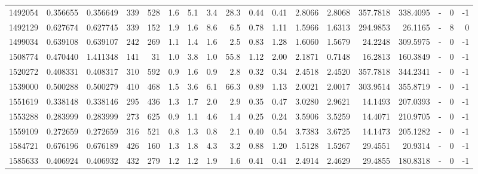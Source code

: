 \begin{tabular}{rrrrrrrrrrrrrrrlrr}
   1492054 & 0.356655 &   0.356649 &  339 &  528 &      1.6 &      5.1 &     3.4 &     28.3 &       0.44 &        0.41 &  2.8066 &  2.8068 &  357.7818 &  338.4095 &             - &        0 &         -1 \\
   1492129 & 0.627674 &   0.627745 &  339 &  152 &      1.9 &      1.6 &     8.6 &      6.5 &       0.78 &        1.11 &  1.5966 &  1.6313 &  294.9853 &   26.1165 &             - &        8 &          0 \\
   1499034 & 0.639108 &   0.639107 &  242 &  269 &      1.1 &      1.4 &     1.6 &      2.5 &       0.83 &        1.28 &  1.6060 &  1.5679 &   24.2248 &  309.5975 &             - &        0 &         -1 \\
   1508774 & 0.470440 &   1.411348 &  141 &   31 &      1.0 &      3.8 &     1.0 &     55.8 &       1.12 &        2.00 &  2.1871 &  0.7148 &   16.2813 &  160.3849 &             - &        0 &         -1 \\
   1520272 & 0.408331 &   0.408317 &  310 &  592 &      0.9 &      1.6 &     0.9 &      2.8 &       0.32 &        0.34 &  2.4518 &  2.4520 &  357.7818 &  344.2341 &             - &        0 &         -1 \\
   1539000 & 0.500288 &   0.500279 &  410 &  468 &      1.5 &      3.6 &     6.1 &     66.3 &       0.89 &        1.13 &  2.0021 &  2.0017 &  303.9514 &  355.8719 &             - &        0 &         -1 \\
   1551619 & 0.338148 &   0.338146 &  295 &  436 &      1.3 &      1.7 &     2.0 &      2.9 &       0.35 &        0.47 &  3.0280 &  2.9621 &   14.1493 &  207.0393 &             - &        0 &         -1 \\
   1553288 & 0.283999 &   0.283999 &  273 &  625 &      0.9 &      1.1 &     4.6 &      1.4 &       0.25 &        0.24 &  3.5906 &  3.5259 &   14.4071 &  210.9705 &             - &        0 &         -1 \\
   1559109 & 0.272659 &   0.272659 &  316 &  521 &      0.8 &      1.3 &     0.8 &      2.1 &       0.40 &        0.54 &  3.7383 &  3.6725 &   14.1473 &  205.1282 &             - &        0 &         -1 \\
   1584721 & 0.676196 &   0.676189 &  426 &  160 &      1.3 &      1.8 &     4.3 &      3.2 &       0.88 &        1.20 &  1.5128 &  1.5267 &   29.4551 &   20.9314 &             - &        0 &         -1 \\
   1585633 & 0.406924 &   0.406932 &  432 &  279 &      1.2 &      1.2 &     1.9 &      1.6 &       0.41 &        0.41 &  2.4914 &  2.4629 &   29.4855 &  180.8318 &             - &        0 &         -1 \\

\end{tabular}
